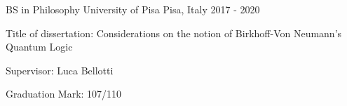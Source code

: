 \begin{cventries}
  \cventry
    {BS in Philosophy} %
    {University of Pisa} %
    {Pisa, Italy} %
    {2017 - 2020} %
    {
      \begin{cvitems} %
      \item {Title of dissertation: Considerations on the notion of Birkhoff-Von Neumann's Quantum Logic}
             \item {Supervisor: Luca Bellotti}
             \item {Graduation Mark: 107/110}   
      \end{cvitems}
    }

\end{cventries}
